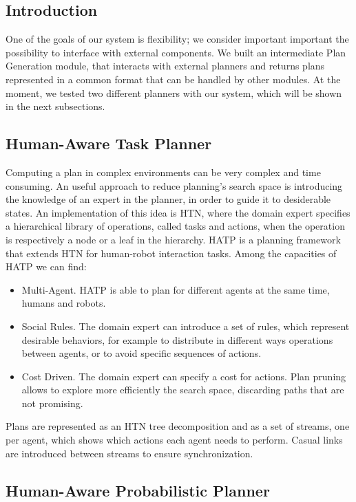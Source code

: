 \subsection{Introduction}
\label{subsec-plan_management_hatp}
One of the goals of our system is flexibility; we consider important important the possibility to interface with external components. We built an intermediate Plan Generation module, that interacts with external planners and returns plans represented in a common format that can be handled by other modules. At the moment, we tested two different planners with our system, which will be shown in the next subsections.

\subsection{Human-Aware Task Planner}
Computing a plan in complex environments can be very complex and time consuming. An useful approach to reduce planning's search space is introducing the knowledge of an expert in the planner, in order to guide it to desiderable states. An implementation of this idea is HTN, where the domain expert specifies a hierarchical library of operations, called tasks and actions, when the operation is respectively a node or a leaf in the hierarchy.  HATP is a planning framework that extends HTN for human-robot interaction tasks. Among the capacities of HATP we can find:
\begin{itemize}
\item Multi-Agent. HATP is able to plan for different agents at the same time, humans and robots.
\item Social Rules. The domain expert can introduce a set of rules, which represent desirable behaviors, for example to distribute in different ways operations between agents, or to avoid specific sequences of actions.
\item Cost Driven. The domain expert can specify a cost for actions. Plan pruning allows to explore more efficiently the search space, discarding paths that are not promising.
\end{itemize} 

Plans are represented as an HTN tree decomposition and as a set of streams, one per agent, which shows which actions each agent needs to perform. Casual links are introduced between streams to ensure synchronization.

\subsection{Human-Aware Probabilistic Planner}
\label{subsec-plan_management_happ}

